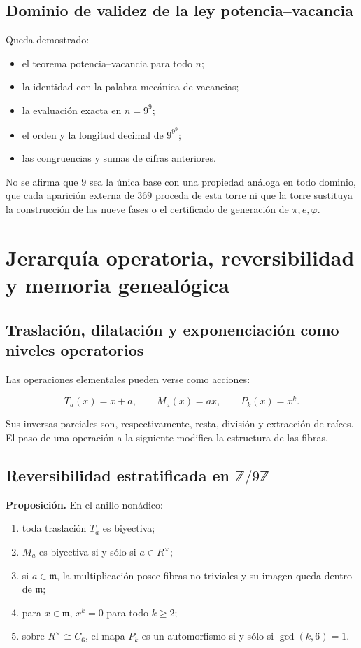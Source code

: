\subsection{Dominio de validez de la ley potencia--vacancia}

Queda demostrado:

\begin{itemize}
\item el teorema potencia–vacancia para todo \(n\);
\item la identidad con la palabra mecánica de vacancias;
\item la evaluación exacta en \(n=9^9\);
\item el orden y la longitud decimal de \(9^{9^9}\);
\item las congruencias y sumas de cifras anteriores.
\end{itemize}

No se afirma que \(9\) sea la única base con una propiedad análoga en todo dominio, que cada aparición externa de \(369\) proceda de esta torre ni que la torre sustituya la construcción de las nueve fases o el certificado de generación de \(\pi,e,\varphi\).


\section{Jerarquía operatoria, reversibilidad y memoria genealógica}

\subsection{Traslación, dilatación y exponenciación como niveles operatorios}

Las operaciones elementales pueden verse como acciones:

\[
T_a(x)=x+a,\qquad
M_a(x)=ax,\qquad
P_k(x)=x^k.
\]

Sus inversas parciales son, respectivamente, resta, división y extracción de raíces. El paso de una operación a la siguiente modifica la estructura de las fibras.

\subsection{Reversibilidad estratificada en \(\mathbb Z/9\mathbb Z\)}

\textbf{Proposición.} En el anillo nonádico:

\begin{enumerate}
\item toda traslación \(T_a\) es biyectiva;
\item \(M_a\) es biyectiva si y sólo si \(a\in R^\times\);
\item si \(a\in\mathfrak m\), la multiplicación posee fibras no triviales y su imagen queda dentro de \(\mathfrak m\);
\item para \(x\in\mathfrak m\), \(x^k=0\) para todo \(k\ge2\);
\item sobre \(R^\times\cong C_6\), el mapa \(P_k\) es un automorfismo si y sólo si \(\gcd(k,6)=1\).
\end{enumerate}

